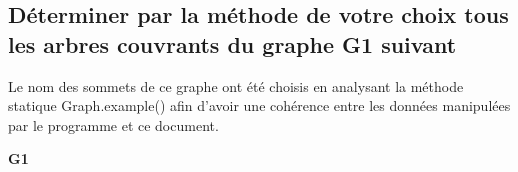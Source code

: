 \subsection{Déterminer par la méthode de votre choix tous les arbres couvrants du graphe G1 suivant}\label{subsec:Q1}

Le nom des sommets de ce graphe ont été choisis en analysant la méthode statique Graph.example() afin d'avoir une cohérence entre les données manipulées par le programme et ce document.

\begin{center}

    \textbf{G1}

\end{center}

